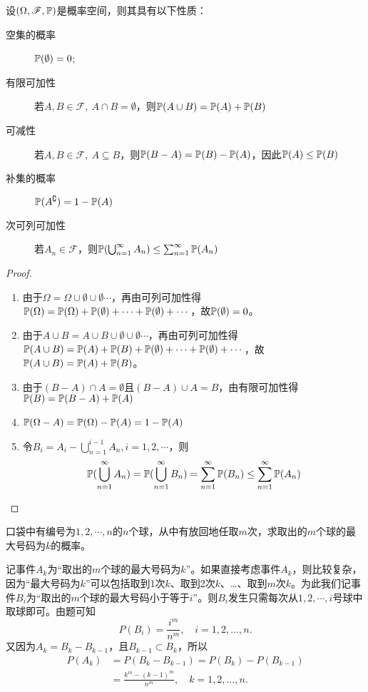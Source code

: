 \begin{proposition}[概率的加减性质]
    设$(\Omega,\mathscr{F},\P)$是概率空间，则其具有以下性质：
    \begin{description}
        \item[空集的概率]$\P(\emptyset)=0$;
        \item[有限可加性] 若$A,B \in \mathscr{F},\ A \cap B = \emptyset$，则$\P(A \cup B) = \P(A) + \P(B)$
        \item[可减性] 若$A,B \in \mathscr{F},\ A \subseteq B$，则$\P(B - A) = \P(B) - \P(A)$，因此$\P(A) \le \P(B)$
        \item[补集的概率]$\P(A^{\complement})=1-\P(A)$
        \item[次可列可加性] 若$A_n \in \mathscr{F}$，则$\P(\bigcup_{n=1}^{\infty}A_{n}) \le  \sum_{n=1}^{\infty}\P(A_{n})$
    \end{description}
\end{proposition}
\begin{proof}
    \begin{enumerate}
        \item 由于$\Omega=\Omega \cup \emptyset \cup \emptyset \cdots$，再由可列可加性得$\P(\Omega)=\P(\Omega)+\P(\emptyset)+\cdots + \P(\emptyset)+\cdots$，故$\P(\emptyset)=0$。
        \item 由于$A \cup B=A \cup B \cup \emptyset \cup \emptyset \cdots$，再由可列可加性得$\P(A \cup B)=\P(A)+\P(B)+ \P(\emptyset) +\cdots + \P(\emptyset)+\cdots$，故$\P(A \cup B) = \P(A) + \P(B)$。
        \item 由于$(B-A) \cap A=\emptyset$且$(B-A) \cup A=B$，由有限可加性得$\P(B)= \P(B - A) + \P(A)$
        \item$\P(\Omega-A)=\P(\Omega)-\P(A)=1-\P(A)$
        \item 令$B_i=A_i-\bigcup_{n=1}^{i-1}A_{n}, i=1,2,\cdots$，则
             $$\P(\bigcup_{n=1}^{\infty}A_{n})=\P(\bigcup_{n=1}^{\infty}B_{n}) = \sum_{n=1}^{\infty}\P(B_{n})\le  \sum_{n=1}^{\infty}\P(A_{n})$$
    \end{enumerate}
\end{proof}

\begin{example}
    口袋中有编号为$1, 2, \cdots, n$的$n$个球，从中有放回地任取$m$次，求取出的$m$个球的最大号码为$k$的概率。
\end{example}
\begin{solution}
    记事件$A_k$为“取出的$m$个球的最大号码为$k$”。如果直接考虑事件$A_k$，则比较复杂，因为“最大号码为$k$”可以包括取到1次$k$、取到2次$k$、\dots、取到$m$次$k$。为此我们记事件$B_i$为“取出的$m$个球的最大号码小于等于$i$”。则$B_i$发生只需每次从$1,2,\cdots ,i$号球中取球即可。由题可知
    \[  P(B_i) = \frac{i^m}{n^m}, \quad i = 1, 2, \dotsc, n. \]
    又因为$A_k = B_k - B_{k-1}$，且$B_{k-1} \subset B_k$，所以
    \begin{align*}
        P(A_k) & = P(B_k - B_{k-1}) = P(B_k) - P(B_{k-1})                 \\
               & = \frac{k^m - (k - 1)^m}{n^m}, \quad k = 1,2, \dotsc, n.
    \end{align*}
\end{solution}

